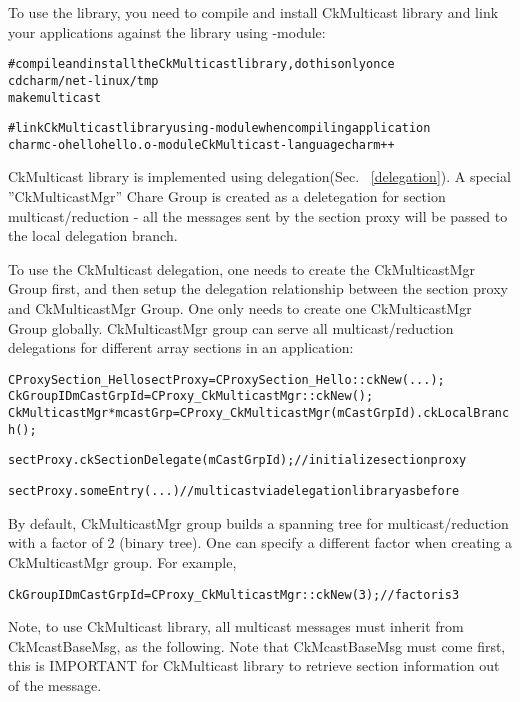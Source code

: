 \label {array_section_multicast}

To use the library, you need to compile and install CkMulticast library and 
link your applications against the library using -module:

\begin{alltt}
  # compile and install the CkMulticast library, do this only once
  cd charm/net-linux/tmp
  make multicast

  # link CkMulticast library using -module when compiling application
  charmc  -o hello hello.o -module CkMulticast -language charm++ 
\end{alltt}

CkMulticast library is implemented using delegation(Sec. ~\ref{delegation}). 
A special ''CkMulticastMgr'' Chare Group is created as a 
deletegation for section multicast/reduction - all the messages sent
by the section proxy will be passed to the local delegation branch.

To use the CkMulticast delegation, one needs to create the CkMulticastMgr Group 
first, and then setup the delegation relationship between the section proxy and 
CkMulticastMgr Group. 
One only needs to create one CkMulticastMgr Group globally.
CkMulticastMgr group can serve all multicast/reduction delegations
for different array sections in an application:

\begin{alltt}
  CProxySection_Hello sectProxy = CProxySection_Hello::ckNew(...);
  CkGroupID mCastGrpId = CProxy_CkMulticastMgr::ckNew();
  CkMulticastMgr *mcastGrp = CProxy_CkMulticastMgr(mCastGrpId).ckLocalBranch();

  sectProxy.ckSectionDelegate(mCastGrpId);  // initialize section proxy

  sectProxy.someEntry(...)           //multicast via delegation library as before
\end{alltt}

By default, CkMulticastMgr group builds a spanning tree for multicast/reduction
with a factor of 2 (binary tree).
One can specify a different factor when creating a CkMulticastMgr group.
For example,

\begin{alltt}
  CkGroupID mCastGrpId = CProxy_CkMulticastMgr::ckNew(3);   // factor is 3
\end{alltt}

Note, to use CkMulticast library, all multicast messages must inherit from 
CkMcastBaseMsg, as the following.
Note that CkMcastBaseMsg must come first, this is IMPORTANT for CkMulticast 
library to retrieve section information out of the message.


